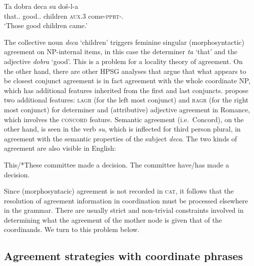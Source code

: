 {\begin{exe}
\ex \gll Ta dobra deca su do\v{s}-l-a\\
         that.\SG.\F{} good.\SG.\F{} children \textsc{aux}.3\PL{} come-\textsc{pprt}-\N.\PL\\
  \glt `Those good children came.'  \citep[51]{wechsler} 
\end{exe}

\noindent
The collective noun \emph{deca} `children' triggers feminine singular (morphosyntactic) agreement on NP-internal items, in this case the determiner \emph{ta} `that' and the adjective \emph{dobra} `good'.   This is a problem for a locality theory of agreement. On the other hand, there are other HPSG analyses that argue that what appears to be closest conjunct agreement is in fact agreement with the whole coordinate NP, which has additional features inherited from the first and last conjuncts. \citet[Section~5]{Villavicencio:Sadler:ea:05} propose two additional features: \textsc{lagr} (for the left most conjunct) and \textsc{ragr} (for the right most conjunct) for determiner and (attributive) adjective agreement in Romance, which involves the \textsc{concord} feature.
Semantic agreement (i.e.\ Concord), on the other hand, is seen in the verb \emph{su}, which  is inflected for third person plural, in agreement with the semantic properties of the subject \emph{deca}. The two kinds of agreement are also visible in
English:

\begin{exe}
\ex
\begin{xlista}
\ex This/*These committee made a decision.
\ex The committee have/has made a decision.
\end{xlista}
\end{exe}


\noindent
Since (morphosyntacic) agreement is not recorded in \textsc{cat}, it follows that the resolution of agreement information in coordination must be processed elsewhere in the grammar. There are usually strict and non-trivial constraints involved in determining what the agreement of the mother node is given that of the coordinands. We turn to this problem below.






\subsection{Agreement strategies with coordinate phrases}


}

